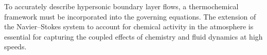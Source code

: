 

To accurately describe hypersonic boundary layer flows, a thermochemical framework must be incorporated into the governing equations. The extension of the Navier--Stokes system to account for chemical activity in the atmosphere is essential for capturing the coupled effects of chemistry and fluid dynamics at high speeds. 


